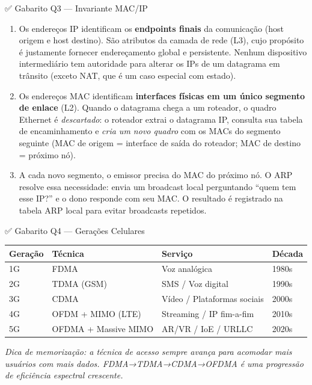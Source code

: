 \documentclass[11pt,a4paper]{article}
\begin{document}
\begin{gabaritocaixa}{✅ Gabarito Q3 --- Invariante MAC/IP}
\begin{enumerate}[label=(\alph*)]
    \item Os endereços IP identificam os \textbf{endpoints finais} da comunicação (host origem e host destino). São atributos da camada de rede (L3), cujo propósito é justamente fornecer endereçamento global e persistente. Nenhum dispositivo intermediário tem autoridade para alterar os IPs de um datagrama em trânsito (exceto NAT, que é um caso especial com estado).
    \item Os endereços MAC identificam \textbf{interfaces físicas em um único segmento de enlace} (L2). Quando o datagrama chega a um roteador, o quadro Ethernet é \emph{descartado}: o roteador extrai o datagrama IP, consulta sua tabela de encaminhamento e \emph{cria um novo quadro} com os MACs do segmento seguinte (MAC de origem = interface de saída do roteador; MAC de destino = próximo nó).
    \item A cada novo segmento, o emissor precisa do MAC do próximo nó. O ARP resolve essa necessidade: envia um broadcast local perguntando ``quem tem esse IP?'' e o dono responde com seu MAC. O resultado é registrado na tabela ARP local para evitar broadcasts repetidos.
\end{enumerate}
\end{gabaritocaixa}

\begin{gabaritocaixa}{✅ Gabarito Q4 --- Gerações Celulares}
\begin{center}
\begin{tabular}{llll}
\toprule
\textbf{Geração} & \textbf{Técnica} & \textbf{Serviço} & \textbf{Década} \\
\midrule
1G & FDMA & Voz analógica & 1980s \\
2G & TDMA (GSM) & SMS / Voz digital & 1990s \\
3G & CDMA & Vídeo / Plataformas sociais & 2000s \\
4G & OFDM + MIMO (LTE) & Streaming / IP fim-a-fim & 2010s \\
5G & OFDMA + Massive MIMO & AR/VR / IoE / URLLC & 2020s \\
\bottomrule
\end{tabular}
\end{center}
\textit{Dica de memorização: a técnica de acesso sempre avança para acomodar mais usuários com mais dados. FDMA→TDMA→CDMA→OFDMA é uma progressão de eficiência espectral crescente.}
\end{gabaritocaixa}
\end{document}
